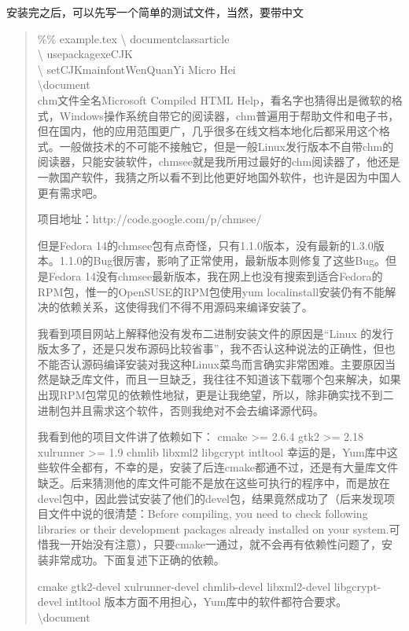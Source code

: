 \documentclass{article}
\begin{document}
安装完之后，可以先写一个简单的测试文件，当然，要带中文
\begin{quote}

\%\% example.tex
\textbackslash
documentclass{article}\\
\textbackslash
usepackage{xeCJK}  %
\\
\textbackslash
setCJKmainfont{WenQuanYi Micro Hei}  %
\\
\textbackslash {document}\\
chm文件全名Microsoft Compiled HTML Help，看名字也猜得出是微软的格式，Windows操作系统自带它的阅读器，chm普遍用于帮助文件和电子书，但在国内，他的应用范围更广，几乎很多在线文档本地化后都采用这个格式。一般做技术的不可能不接触它，但是一般Linux发行版本不自带chm的阅读器，只能安装软件，chmsee就是我所用过最好的chm阅读器了，他还是一款国产软件，我猜之所以看不到比他更好地国外软件，也许是因为中国人更有需求吧。
 
项目地址：http://code.google.com/p/chmsee/
 
但是Fedora 14的chmsee包有点奇怪，只有1.1.0版本，没有最新的1.3.0版本。1.1.0的Bug很厉害，影响了正常使用，最新版本则修复了这些Bug。但是Fedora 14没有chmsee最新版本，我在网上也没有搜索到适合Fedora的RPM包，惟一的OpenSUSE的RPM包使用yum localinstall安装仍有不能解决的依赖关系，这使得我们不得不用源码来编译安装了。
 
我看到项目网站上解释他没有发布二进制安装文件的原因是“Linux 的发行版太多了，还是只发布源码比较省事”，我不否认这种说法的正确性，但也不能否认源码编译安装对我这种Linux菜鸟而言确实非常困难。主要原因当然是缺乏库文件，而且一旦缺乏，我往往不知道该下载哪个包来解决，如果出现RPM包常见的依赖性地狱，更是让我绝望，所以，除非确实找不到二进制包并且需求这个软件，否则我绝对不会去编译源代码。
 
我看到他的项目文件讲了依赖如下：
cmake >= 2.6.4
gtk2 >= 2.18
xulrunner >= 1.9
chmlib
libxml2
libgcrypt
intltool
幸运的是，Yum库中这些软件全都有，不幸的是，安装了后连cmake都通不过，还是有大量库文件缺乏。后来猜测他的库文件可能不是放在这些可执行的程序中，而是放在devel包中，因此尝试安装了他们的devel包，结果竟然成功了（后来发现项目文件中说的很清楚：Before compiling, you need to check following libraries or their development packages already installed on your system.可惜我一开始没有注意），只要cmake一通过，就不会再有依赖性问题了，安装非常成功。下面复述下正确的依赖。
 
cmake
gtk2-devel
xulrunner-devel
chmlib-devel
libxml2-devel
libgcrypt-devel
intltool
版本方面不用担心，Yum库中的软件都符合要求。
\textbackslash {document}
\end{quote}
\end{document}
